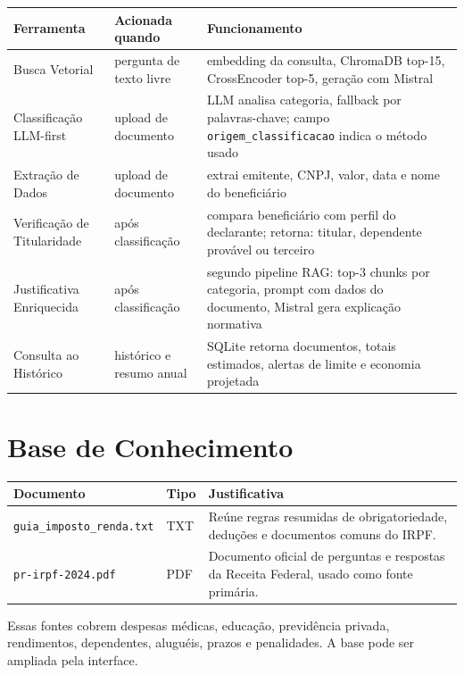 \documentclass[11pt,a4paper,oneside]{article}
\begin{document}
\begin{center}
\begin{tabularx}{\textwidth}{@{}L{46mm}L{36mm}Y@{}}
\toprule
\textbf{Ferramenta} & \textbf{Acionada quando} & \textbf{Funcionamento} \\
\midrule
Busca Vetorial & pergunta de texto livre & embedding da consulta, ChromaDB top-15, CrossEncoder top-5, geração com Mistral \\
Classificação LLM-first & upload de documento & LLM analisa categoria, fallback por palavras-chave; campo \texttt{origem\_classificacao} indica o método usado \\
Extração de Dados & upload de documento & extrai emitente, CNPJ, valor, data e nome do beneficiário \\
Verificação de Titularidade & após classificação & compara beneficiário com perfil do declarante; retorna: titular, dependente provável ou terceiro \\
Justificativa Enriquecida & após classificação & segundo pipeline RAG: top-3 chunks por categoria, prompt com dados do documento, Mistral gera explicação normativa \\
Consulta ao Histórico & histórico e resumo anual & SQLite retorna documentos, totais estimados, alertas de limite e economia projetada \\
\bottomrule
\end{tabularx}
\end{center}

\section{Base de Conhecimento}

\begin{longtable}{@{}L{56mm}L{15mm}L{84mm}@{}}
\toprule
\textbf{Documento} & \textbf{Tipo} & \textbf{Justificativa} \\
\midrule
\endhead
\texttt{guia\_imposto\_renda.txt} & TXT & Reúne regras resumidas de obrigatoriedade, deduções e documentos comuns do IRPF. \\
\texttt{pr-irpf-2024.pdf} & PDF & Documento oficial de perguntas e respostas da Receita Federal, usado como fonte primária. \\
\bottomrule
\end{longtable}

Essas fontes cobrem despesas médicas, educação, previdência privada, rendimentos, dependentes, aluguéis, prazos e penalidades. A base pode ser ampliada pela interface.
\end{document}
